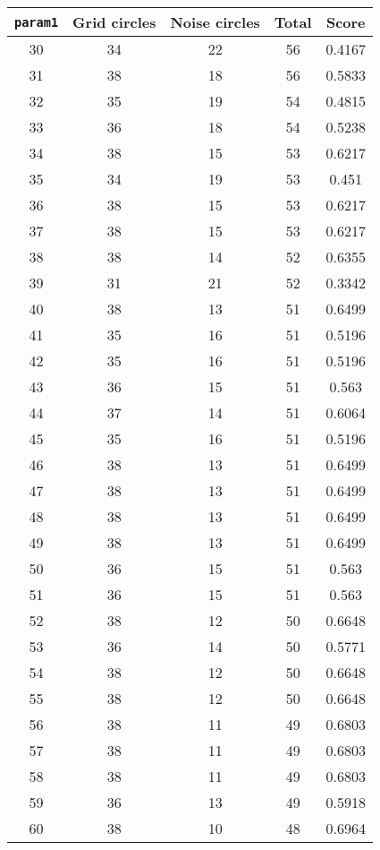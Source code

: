 \documentclass[letterpaper, 12pt]{article}
\begin{document}
\begin{longtable}{|c|c|c|c|c|}
\hline
\textbf{\texttt{param1}} & \textbf{Grid circles} & \textbf{Noise circles} & \textbf{Total} & \textbf{Score} \\
\hline
30 & 34 & 22 & 56 & 0.4167 \\
\hline
31 & 38 & 18 & 56 & 0.5833 \\
\hline
32 & 35 & 19 & 54 & 0.4815 \\
\hline
33 & 36 & 18 & 54 & 0.5238 \\
\hline
34 & 38 & 15 & 53 & 0.6217 \\
\hline
35 & 34 & 19 & 53 & 0.451 \\
\hline
36 & 38 & 15 & 53 & 0.6217 \\
\hline
37 & 38 & 15 & 53 & 0.6217 \\
\hline
38 & 38 & 14 & 52 & 0.6355 \\
\hline
39 & 31 & 21 & 52 & 0.3342 \\
\hline
40 & 38 & 13 & 51 & 0.6499 \\
\hline
41 & 35 & 16 & 51 & 0.5196 \\
\hline
42 & 35 & 16 & 51 & 0.5196 \\
\hline
43 & 36 & 15 & 51 & 0.563 \\
\hline
44 & 37 & 14 & 51 & 0.6064 \\
\hline
45 & 35 & 16 & 51 & 0.5196 \\
\hline
46 & 38 & 13 & 51 & 0.6499 \\
\hline
47 & 38 & 13 & 51 & 0.6499 \\
\hline
48 & 38 & 13 & 51 & 0.6499 \\
\hline
49 & 38 & 13 & 51 & 0.6499 \\
\hline
50 & 36 & 15 & 51 & 0.563 \\
\hline
51 & 36 & 15 & 51 & 0.563 \\
\hline
52 & 38 & 12 & 50 & 0.6648 \\
\hline
53 & 36 & 14 & 50 & 0.5771 \\
\hline
54 & 38 & 12 & 50 & 0.6648 \\
\hline
55 & 38 & 12 & 50 & 0.6648 \\
\hline
56 & 38 & 11 & 49 & 0.6803 \\
\hline
57 & 38 & 11 & 49 & 0.6803 \\
\hline
58 & 38 & 11 & 49 & 0.6803 \\
\hline
59 & 36 & 13 & 49 & 0.5918 \\
\hline
60 & 38 & 10 & 48 & 0.6964 \\

\end{longtable}
\end{document}
